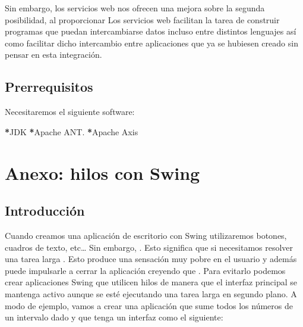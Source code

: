 \documentclass[letterpaper,10pt,spanish]{sphinxmanual}
\begin{document}
Sin embargo, los servicios web nos ofrecen una mejora sobre la segunda
posibilidad, al proporcionar  Los servicios web facilitan la tarea de
construir programas que puedan intercambiarse datos incluso entre distintos
lenguajes así como facilitar dicho intercambio entre aplicaciones que ya se
hubiesen creado sin pensar en esta integración.


\section{Prerrequisitos}
\label{\detokenize{textos/tema6:prerrequisitos}}
Necesitaremos el siguiente software:

{\color{red}\bfseries{}*}JDK
{\color{red}\bfseries{}*}Apache ANT.
{\color{red}\bfseries{}*}Apache Axis


\chapter{Anexo: hilos con Swing}
\label{\detokenize{textos/anexo_hilos_con_swing:anexo-hilos-con-swing}}\label{\detokenize{textos/anexo_hilos_con_swing::doc}}

\section{Introducción}
\label{\detokenize{textos/anexo_hilos_con_swing:introduccion}}
Cuando creamos una aplicación de escritorio con Swing utilizaremos botones, cuadros de texto, etc… Sin embargo,  . Esto significa que si necesitamos resolver una tarea larga  . Esto produce una sensación muy pobre en el usuario y además puede impulsarle a cerrar la aplicación creyendo que  . Para evitarlo podemos crear aplicaciones Swing que utilicen hilos de manera que el interfaz principal se mantenga activo aunque se esté ejecutando una tarea larga en segundo plano. A modo de ejemplo, vamos a crear una aplicación que sume todos los números de un intervalo dado y que tenga un interfaz como el siguiente:

\begin{figure}[htbp]
\centering

\noindent{}
\end{figure}
\end{document}
